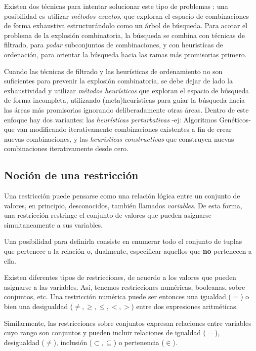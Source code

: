 \documentclass{llncs}
\begin{document}
   Existen dos técnicas para intentar solucionar este tipo de problemas \cite{sol}: una posibilidad es utilizar \textit{métodos exactos}, que exploran el espacio de combinaciones de forma exhaustiva estructurándolo como un árbol de búsqueda. Para acotar el problema de la
    explosión combinatoria, la búsqueda se combina con técnicas de filtrado, para
    \textit{podar} subconjuntos de combinaciones, y con heuristícas de ordenación, para orientar la búsqueda hacia las ramas más promisorias primero.
    
    Cuando las técnicas de filtrado y las heurísticas de ordenamiento no son suficientes para prevenir la explosión combinatoria, se debe dejar de lado la exhaustividad y utilizar \textit{métodos heurísticos} que exploran el espacio de búsqueda de forma incompleta, utilizando (meta)heurísticas para guiar la búsqueda hacia las áreas más promisorias ignorando deliberadamente otras áreas. Dentro de este enfoque hay dos variantes: las \textit{heurísticas perturbativas} -ej: Algoritmos Genéticos- que van modificando iterativamente combinaciones existentes a fin de crear nuevas combinaciones, y las \textit{heurísticas constructivas} que construyen nuevas combinaciones iterativamente desde cero.
    
    \subsection{Noción de una restricción}
      Una restricción puede pensarse como una relación lógica entre un conjunto de valores, en principio,
      desconocidos, también llamados \textit{variables}. De esta forma, una restricción restringe el conjunto
      de valores que pueden asignarse simultaneamente a sus variables.
      
      Una posibilidad para definirla consiste en enumerar todo el conjunto de tuplas que pertenece a la relación o,
      dualmente, especificar aquellos que \textbf{no} pertenecen a ella.
      
      Existen diferentes tipos de restricciones, de acuerdo a los valores que pueden asignarse a las variables. Así,
      tenemos restricciones numéricas, booleanas, sobre conjuntos, etc. Una restricción numérica puede ser entonces
      una igualdad ($=$) o bien una desigualdad ($\neq, \geq, \leq, <, >$) entre dos expresiones aritméticas.
      
      Similarmente, las restricciones sobre conjuntos expresan relaciones entre variables cuyo rango son conjuntos y pueden
      incluir relaciones de igualdad ($=$), desigualdad ($\neq$), inclusión ($\subset, \subseteq$) o pertenencia ($\in$).
      
\end{document}
